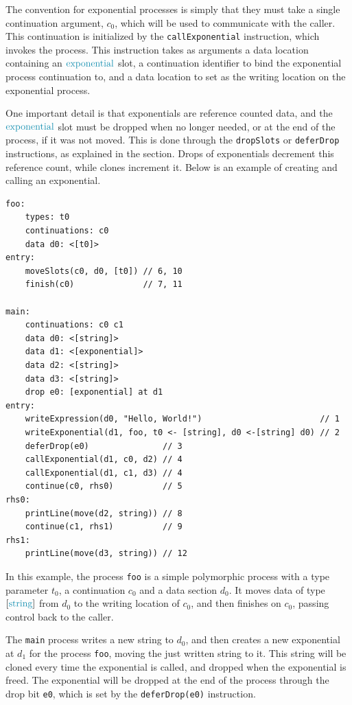The convention for exponential processes is simply that they must take a single continuation argument, $c_0$, which will be used to communicate with the caller. This continuation is initialized by the \texttt{callExponential} instruction, which invokes the process. This instruction takes as arguments a data location containing an $\exponentials$ slot, a continuation identifier to bind the exponential process continuation to, and a data location to set as the writing location on the exponential process.

One important detail is that exponentials are reference counted data, and the $\exponentials$ slot must be dropped when no longer needed, or at the end of the process, if it was not moved. This is done through the \texttt{dropSlots} or \texttt{deferDrop} instructions, as explained in the  section. Drops of exponentials decrement this reference count, while clones increment it. Below is an example of creating and calling an exponential.
\begin{lstlisting}[language=IR, frame=bottom]
foo:
    types: t0
    continuations: c0
    data d0: <[t0]>
entry:
    moveSlots(c0, d0, [t0]) // 6, 10
    finish(c0)              // 7, 11

main:
    continuations: c0 c1
    data d0: <[string]>
    data d1: <[exponential]>
    data d2: <[string]>
    data d3: <[string]>
    drop e0: [exponential] at d1
entry:
    writeExpression(d0, "Hello, World!")                        // 1
    writeExponential(d1, foo, t0 <- [string], d0 <-[string] d0) // 2
    deferDrop(e0)               // 3
    callExponential(d1, c0, d2) // 4
    callExponential(d1, c1, d3) // 4
    continue(c0, rhs0)          // 5
rhs0:
    printLine(move(d2, string)) // 8
    continue(c1, rhs1)          // 9
rhs1:
    printLine(move(d3, string)) // 12
\end{lstlisting}

In this example, the process \texttt{foo} is a simple polymorphic process with a type parameter $t_0$, a continuation $c_0$ and a data section $d_0$. It moves data of type $\seqst{\strings}$ from $d_0$ to the writing location of $c_0$, and then finishes on $c_0$, passing control back to the caller.

The \texttt{main} process writes a new string to $d_0$, and then creates a new exponential at $d_1$ for the process \texttt{foo}, moving the just written string to it. This string will be cloned every time the exponential is called, and dropped when the exponential is freed. The exponential will be dropped at the end of the process through the drop bit \texttt{e0}, which is set by the \texttt{deferDrop(e0)} instruction.

